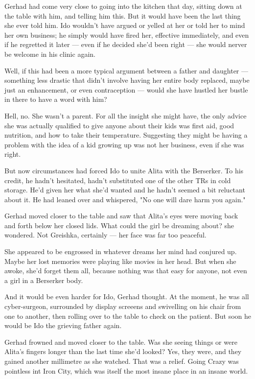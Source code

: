 \documentclass[11pt]{article}
\begin{document}
Gerhad had come very close to going into the kitchen that day, sitting down at the table with him, and telling him this. But it would have been the last thing she ever told him. Ido wouldn't have argued or yelled at her or told her to mind her own business; he simply would have fired her, effective immediately, and even if he regretted it later --- even if he decided she'd been right --- she would nerver be welcome in his clinic again.

Well, if this had been a more typical argument between a father and daughter --- something less  drastic that didn't involve having her entire body replaced, maybe just an enhancement, or even contraception --- would she have hustled her bustle in there to have a word with him?

Hell, no. She wasn't a parent. For all the insight she might have, the only advice she was actually qualified to give anyone about their kids was first aid, good nutrition, and how to take their temperature. Suggesting they might be having a problem with the idea of a kid growing up was not her business, even if she was right.

But now circumstances had forced Ido to unite Alita with the Berserker. To his credit, he hadn't hesitated, hadn't substituted one of the other TRs in cold storage. He'd given her what she'd wanted and he hadn't seemed a bit reluctant about it. He had leaned over and whispered, "No one will dare harm you again."

Gerhad moved closer to the table and saw that Alita's eyes were moving back and forth below her closed lids. What could the girl be dreaming about? she wondered. Not Greishka, certainly --- her face was far too peaceful.

She appeared to be engrossed in whatever dreams her mind had conjured up. Maybe her lost memories were playing like movies in her head. But when she awoke, she'd forget them all, because nothing was that easy for anyone, not even a girl in a Berserker body.

And it would be even harder for Ido, Gerhad thought. At the moment, he was all cyber-surgeon, surrounded by display screeens and swivelling on his chair from one to another, then rolling over to the table to check on the patient. But soon he would be Ido the grieving father again.

Gerhad frowned and moved closer to the table. Was she seeing things or were Alita's fingers longer than the last time she'd looked? Yes, they were, and they gained another millimetre as she watched. That was a relief. Going Crazy was pointless int Iron City, which was itself the most insane place in an insane world.
\end{document}
